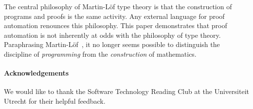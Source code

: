 \documentclass[preprint]{sigplanconf}
\begin{document}
The central philosophy of Martin-L\"of type theory is that the
construction of programs and proofs is the same activity. Any
external language for proof automation renounces this philosophy. This
paper demonstrates that proof automation is not inherently at odds
with the philosophy of type theory. Paraphrasing
Martin-L\"of~\cite{martin-lof}, it no longer seems possible to
distinguish the discipline of \emph{programming} from the
\emph{construction} of mathematics.







\paragraph{Acknowledgements}
We would like to thank the Software Technology Reading Club at the
Universiteit Utrecht for their helpful feedback.




\end{document}
